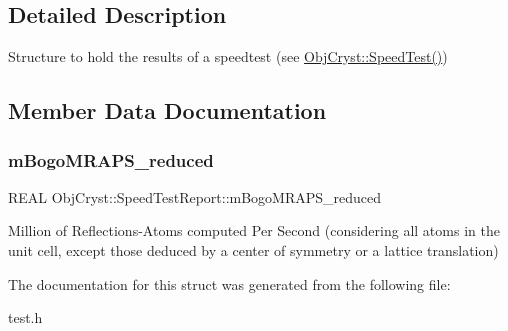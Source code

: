 \subsection{Detailed Description}
Structure to hold the results of a speedtest (see \mbox{\hyperlink{namespace_obj_cryst_a775b62d07c596365d2f2d021dca408db}{Obj\+Cryst\+::\+Speed\+Test()}}) 

\subsection{Member Data Documentation}
\mbox{\label{struct_obj_cryst_1_1_speed_test_report_a76d9645d24f787e53856512fbb918603}} 
\subsubsection{\texorpdfstring{mBogoMRAPS\_reduced}{mBogoMRAPS\_reduced}}
{\footnotesize\ttfamily R\+E\+AL Obj\+Cryst\+::\+Speed\+Test\+Report\+::m\+Bogo\+M\+R\+A\+P\+S\+\_\+reduced}

Million of Reflections-\/\+Atoms computed Per Second (considering all atoms in the unit cell, except those deduced by a center of symmetry or a lattice translation) 

The documentation for this struct was generated from the following file\+:\begin{DoxyCompactItemize}
\item 
test.\+h\end{DoxyCompactItemize}
